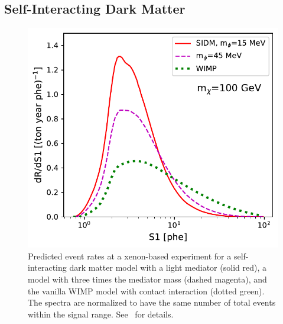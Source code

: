 \subsection{Self-Interacting Dark Matter}\label{sec:selfinteracting}

\begin{figure}[!htbp] 
	\centering
	\includegraphics[width=\columnwidth]{fig_sidmspectrum.pdf}
	\caption{Predicted event rates at a xenon-based experiment for a self-interacting dark matter model with a light mediator (solid red), a model with three times the mediator mass (dashed magenta), and the vanilla WIMP model with contact interaction (dotted green). The spectra are normalized to have the same number of total events within the signal range. See~\cite{DelNobile:2015uua} for details.} 
	\label{fig:s1_sidmspectrum}
\end{figure}

